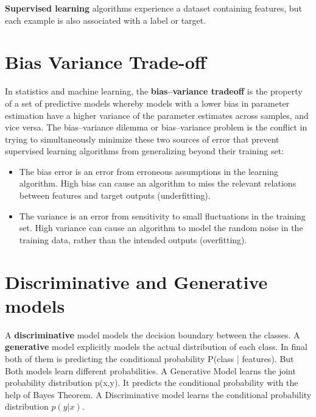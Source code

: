 \documentclass[12pt]{report}
\begin{document}
        \textbf{Supervised learning} algorithms experience a dataset containing features, but each example is also associated with a label or target.
        
    \section{Bias Variance Trade-off}
        In statistics and machine learning, the \textbf{bias–variance tradeoff} is the property of a set of predictive models whereby models with a lower bias in parameter estimation have a higher variance of the parameter estimates across samples, and vice versa. The bias–variance dilemma or bias–variance problem is the conflict in trying to simultaneously minimize these two sources of error that prevent supervised learning algorithms from generalizing beyond their training set:
        \begin{itemize}
            \item The bias error is an error from erroneous assumptions in the learning algorithm. High bias can cause an algorithm to miss the relevant relations between features and target outputs (underfitting).
            \item The variance is an error from sensitivity to small fluctuations in the training set. High variance can cause an algorithm to model the random noise in the training data, rather than the intended outputs (overfitting).
        \end{itemize}
        
    \section{Discriminative and Generative models}
        A \textbf{discriminative} model models the decision boundary between the classes. A \textbf{generative} model explicitly models the actual distribution of each class. In final both of them is predicting the conditional probability P(class | features). But Both models learn different probabilities.
        A Generative Model learns the joint probability distribution p(x,y). It predicts the conditional probability with the help of Bayes Theorem. A Discriminative model learns the conditional probability distribution $p(y|x)$.
\end{document}
